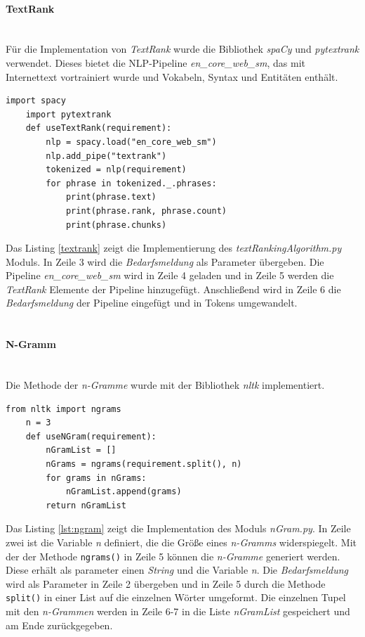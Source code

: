 \paragraph{TextRank}\mbox{}\\
Für die Implementation von \emph{TextRank} wurde die Bibliothek \emph{spaCy} und \emph{pytextrank} verwendet. Dieses bietet die NLP-Pipeline \emph{en\_core\_web\_sm}, das mit Internettext vortrainiert wurde und Vokabeln, Syntax und Entitäten enthält.
\begin{lstlisting}[caption={Implementation des Moduls \emph{textRankingAlgorithm.py}}, label=lst:textrank]
	import spacy
	import pytextrank
	def useTextRank(requirement):
		nlp = spacy.load("en_core_web_sm")
		nlp.add_pipe("textrank")
		tokenized = nlp(requirement)
		for phrase in tokenized._.phrases:
			print(phrase.text)
			print(phrase.rank, phrase.count)
			print(phrase.chunks)
\end{lstlisting}
Das Listing \ref{textrank} zeigt die Implementierung des \emph{textRankingAlgorithm.py} Moduls. In Zeile 3 wird die \emph{Bedarfsmeldung} als Parameter übergeben. Die Pipeline \emph{en\_core\_web\_sm} wird in Zeile 4 geladen und in Zeile 5 werden die \emph{TextRank} Elemente der Pipeline hinzugefügt. Anschließend wird in Zeile 6 die \emph{Bedarfsmeldung} der Pipeline eingefügt und in Tokens umgewandelt.\\
\\
\paragraph{N-Gramm}\mbox{}\\
Die Methode der \emph{n-Gramme} wurde mit der Bibliothek \emph{nltk} implementiert.
\begin{lstlisting}[caption={Implementation des Moduls \emph{nGram.py}}, label=lst:ngram]
	from nltk import ngrams
	n = 3
	def useNGram(requirement):
		nGramList = []
		nGrams = ngrams(requirement.split(), n)
		for grams in nGrams:
			nGramList.append(grams)
		return nGramList
\end{lstlisting}
Das Listing \ref{lst:ngram} zeigt die Implementation des Moduls \emph{nGram.py}. In Zeile zwei ist die Variable \emph{n} definiert, die die Größe eines \emph{n-Gramms} widerspiegelt. Mit der der Methode \lstinline{ngrams()}
in Zeile 5 können die \emph{n-Gramme} generiert werden. Diese erhält als parameter einen \emph{String} und die Variable \emph{n}. Die \emph{Bedarfsmeldung} wird als Parameter in Zeile 2 übergeben und in Zeile 5 durch die Methode \lstinline{split()}
in einer List auf die einzelnen Wörter umgeformt. Die einzelnen Tupel mit den \emph{n-Grammen} werden in Zeile 6-7 in die Liste \emph{nGramList} gespeichert und am Ende zurückgegeben.
